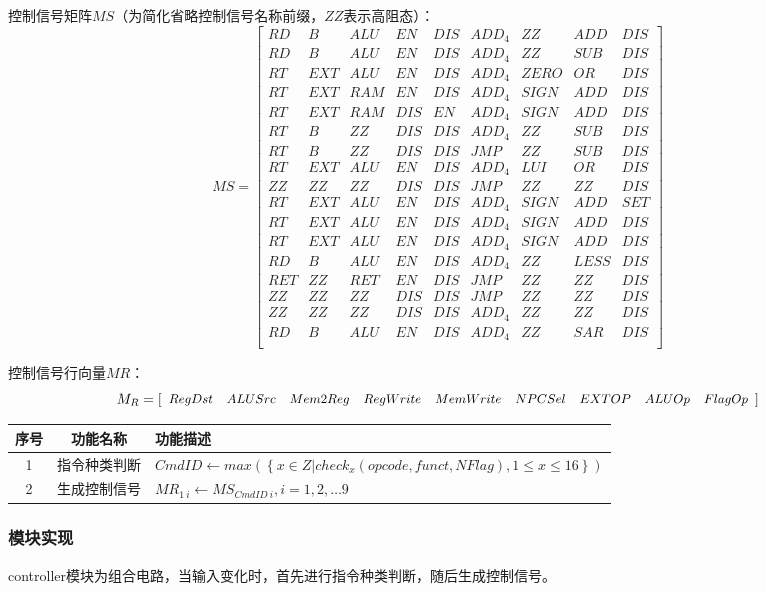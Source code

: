\documentclass[main.tex]{subfiles}
\begin{document}
控制信号矩阵$MS$（为简化省略控制信号名称前缀，$ZZ$表示高阻态）：
$$
MS = 
\left[
\begin{array}{ccccccccc}
    RD & B & ALU & EN & DIS & ADD_4 & ZZ & ADD & DIS \\
    RD & B & ALU & EN & DIS & ADD_4 & ZZ & SUB & DIS \\
    RT & EXT & ALU & EN & DIS & ADD_4 & ZERO & OR & DIS \\
    RT & EXT & RAM & EN & DIS & ADD_4 & SIGN & ADD & DIS \\
    RT & EXT & RAM & DIS & EN & ADD_4 & SIGN & ADD & DIS \\
    RT & B & ZZ & DIS & DIS & ADD_4 & ZZ & SUB & DIS \\
    RT & B & ZZ & DIS & DIS & JMP & ZZ & SUB & DIS \\
    RT & EXT & ALU & EN & DIS & ADD_4 & LUI & OR & DIS \\
    ZZ & ZZ & ZZ & DIS & DIS & JMP & ZZ & ZZ & DIS \\
    RT & EXT & ALU & EN & DIS & ADD_4 & SIGN & ADD & SET \\
    RT & EXT & ALU & EN & DIS & ADD_4 & SIGN & ADD & DIS \\
    RT & EXT & ALU & EN & DIS & ADD_4 & SIGN & ADD & DIS \\
    RD & B & ALU & EN & DIS & ADD_4 & ZZ & LESS & DIS \\
    RET & ZZ & RET & EN & DIS & JMP & ZZ & ZZ & DIS \\
    ZZ & ZZ & ZZ & DIS & DIS & JMP & ZZ & ZZ & DIS \\
    ZZ & ZZ & ZZ & DIS & DIS & ADD_4 & ZZ & ZZ & DIS \\
    RD & B & ALU & EN & DIS & ADD_4 & ZZ & SAR & DIS \\
\end{array}
\right]
$$

控制信号行向量$MR$：
$$
M_R =
\small {
\left[
\begin{array}{ccccccccc}
    RegDst & ALUSrc & Mem2Reg & RegWrite & MemWrite & NPCSel &EXTOP & ALUOp & FlagOp \\
\end{array}
\right]
}
$$

\begin{center}
    \begin{tabular}{c c l}
        \toprule
        序号 & 功能名称 & 功能描述 \\
        \midrule
        1 & 指令种类判断 & $CmdID \leftarrow max\left(\left\{ x\in Z | check_x(opcode, funct, NFlag), 1\leq x \leq 16\right\}\right) $ \\
        2 & 生成控制信号 & $ MR_{1 \  i} \leftarrow MS_{CmdID \ i}, i = 1, 2, \dots9$ \\
        \bottomrule
    \end{tabular}
\end{center}

\subsubsection{模块实现}
controller模块为组合电路，当输入变化时，首先进行指令种类判断，随后生成控制信号。

\clearpage
\end{document}
